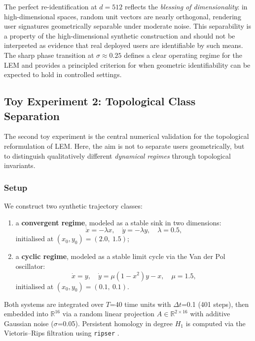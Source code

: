\documentclass[11pt]{article}
\begin{document}
The perfect re-identification at $d=512$ reflects the \emph{blessing of
dimensionality}: in high-dimensional spaces, random unit vectors are nearly
orthogonal, rendering user signatures geometrically separable under moderate noise.
This separability is a property of the high-dimensional synthetic construction and
should not be interpreted as evidence that real deployed users are identifiable by
such means. The sharp phase transition at $\sigma \approx 0.25$ defines a clear
operating regime for the LEM and provides a principled criterion for when geometric
identifiability can be expected to hold in controlled settings.

\subsection{Toy Experiment 2: Topological Class Separation}

The second toy experiment is the central numerical validation for the topological
reformulation of LEM. Here, the aim is not to separate users geometrically, but to
distinguish qualitatively different \emph{dynamical regimes} through topological
invariants.

\subsubsection{Setup}

We construct two synthetic trajectory classes:

\begin{enumerate}[leftmargin=1.8em]
  \item a \textbf{convergent regime}, modeled as a stable sink in two dimensions:
        \begin{equation}
          \dot{x} = -\lambda x, \quad \dot{y} = -\lambda y, \quad \lambda = 0.5,
        \end{equation}
        initialised at $(x_0, y_0) = (2.0,\ 1.5)$;
  \item a \textbf{cyclic regime}, modeled as a stable limit cycle via the Van der Pol
        oscillator:
        \begin{equation}
          \dot{x} = y, \quad \dot{y} = \mu(1 - x^2)y - x, \quad \mu = 1.5,
        \end{equation}
        initialised at $(x_0, y_0) = (0.1,\ 0.1)$.
\end{enumerate}

Both systems are integrated over $T$=40 time units with $\Delta t$=0.1 (401 steps),
then embedded into $\mathbb{R}^{16}$ via a random linear projection
$A \in \mathbb{R}^{2 \times 16}$ with additive Gaussian noise ($\sigma$=0.05).
Persistent homology in degree $H_1$ is computed via the Vietoris--Rips filtration
using \texttt{ripser} \cite{bauer2021ripser,tralie2018ripserpy}.
\end{document}
